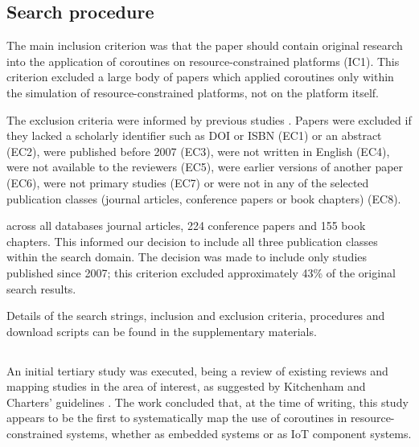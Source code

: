 \subsection{Search procedure}

The main inclusion criterion was that the paper should contain original research into the application of coroutines on resource-constrained platforms (IC1). This criterion excluded a large body of papers which applied coroutines only within the simulation of resource-constrained platforms, not on the platform itself.

The exclusion criteria were informed by previous studies \cite{Kitchenham2007, Petersen2008}. Papers were excluded if they lacked a scholarly identifier such as DOI or ISBN (EC1) or an abstract (EC2), were published before 2007 (EC3), were not written in English (EC4), were not available to the reviewers (EC5), were earlier versions of another paper (EC6), were not primary studies (EC7) or were not in any of the selected publication classes (journal articles, conference papers or book chapters) (EC8).

\DIFdelbegin {}\DIFdelend \DIFaddbegin {}\DIFaddend across all databases\DIFdelbegin {}\DIFdelend \DIFaddbegin {} journal articles, 224 conference papers and 155 book chapters. This informed our decision to include all three publication classes within the search domain. The decision was made to include only studies published since 2007; this criterion excluded approximately 43\% of the original search results.

Details of the search strings, inclusion and exclusion criteria, procedures and download scripts can be found in the supplementary materials.

\DIFaddbegin \subsection{}

\DIFaddend An initial tertiary study was executed, being a review of existing reviews and mapping studies in the area of interest, as suggested by Kitchenham and Charters’ guidelines \cite{Kitchenham2007}. The work concluded that, at the time of writing, this study appears to be the first to systematically map the use of coroutines in resource-constrained systems, whether as embedded systems or as IoT component systems.


